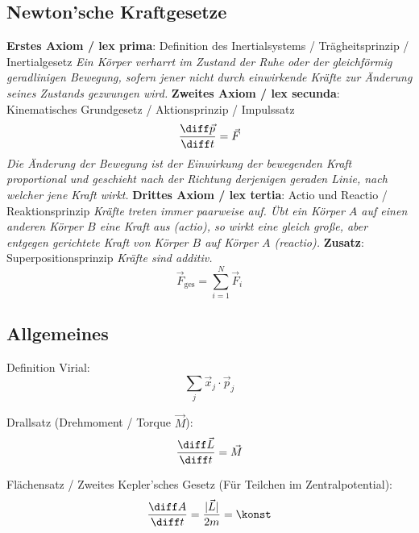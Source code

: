 \documentclass[11pt]{article}
\numberwithin{equation}{section}
\begin{document}
		\subsection{Newton'sche Kraftgesetze}
			\textbf{Erstes Axiom / lex prima}: Definition des Inertialsystems / Trägheitsprinzip / Inertialgesetz \newline
				\indent \emph{Ein Körper verharrt im Zustand der Ruhe oder der gleichförmig geradlinigen Bewegung, sofern jener nicht durch einwirkende Kräfte zur Änderung seines Zustands gezwungen wird.} \nl
			\textbf{Zweites Axiom / lex secunda}: Kinematisches Grundgesetz / Aktionsprinzip / Impulssatz
				\begin{equation}
					\tder{\vec{p}}{t} = \vec{F}
				\end{equation}
				\indent \emph{Die Änderung der Bewegung ist der Einwirkung der bewegenden Kraft proportional und geschieht nach der Richtung derjenigen geraden Linie, nach welcher jene Kraft wirkt.} \nl
			\textbf{Drittes Axiom / lex tertia}: Actio und Reactio / Reaktionsprinzip \newline
				\indent \emph{Kräfte treten immer paarweise auf. Übt ein Körper $A$ auf einen anderen Körper $B$ eine Kraft aus (actio), so wirkt eine gleich große, aber entgegen gerichtete Kraft von Körper $B$ auf Körper $A$ (reactio).} \nl
			\textbf{Zusatz}: Superpositionsprinzip \newline
				\indent \emph{Kräfte sind additiv.}
				\begin{equation}
					\vec{F}_{\mathrm{ges}} = \sum_{i=1}^{N} \vec{F}_i
				\end{equation}

		\subsection{Allgemeines}
			\noindent
			Definition Virial:
			\begin{equation}
				\sum_j \vec{x}_j\cdot\vec{p}_j
			\end{equation}

			\noindent
			Drallsatz (Drehmoment / Torque $\vec{M}$):
			\begin{equation}
				\tder{\vec{L}}{t} = \vec{M}
			\end{equation}

			\noindent
			Flächensatz / Zweites Kepler'sches Gesetz (Für Teilchen im Zentralpotential):
			\begin{equation}
				\tder{A}{t} = \frac{\vbr{\vec{L}}}{2 m} = \konst
			\end{equation}
\end{document}
